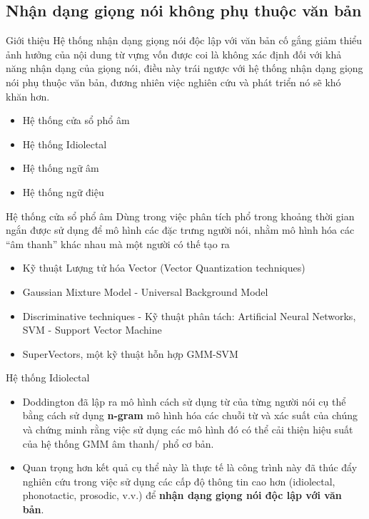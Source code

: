 \documentclass[notheorems, aspectratio=54]{beamer}
\begin{document}
\subsection{Nhận dạng giọng nói không phụ thuộc văn bản}
\begin{frame}{Giới thiệu}
	\qquad Hệ thống nhận dạng giọng nói độc lập với văn bản cố gắng giảm thiểu ảnh hưởng của nội dung từ vựng vốn được coi là không xác định đối với khả năng nhận dạng của giọng nói, điều này trái ngược với hệ thống nhận dạng giọng nói phụ thuộc văn bản, đương nhiên việc nghiên cứu và phát triển nó sẽ khó khăn hơn.
	\begin{itemize}
		\item Hệ thống cửa sổ phổ âm
		\item Hệ thống Idiolectal
		\item Hệ thống ngữ âm
		\item Hệ thống ngữ điệu
	\end{itemize}
\end{frame}
\begin{frame}{Hệ thống cửa sổ phổ âm}
	Dùng trong việc phân tích phổ trong khoảng thời gian ngắn được sử dụng để mô hình các đặc trưng người nói, nhằm mô hình hóa các “âm thanh” khác nhau mà một người có thế tạo ra
	\begin{itemize}
		\item Kỹ thuật Lượng tử hóa Vector (Vector Quantization techniques)
		\item Gaussian Mixture Model - Universal Background Model
		\item Discriminative techniques - Kỹ thuật phân tách: Artificial Neural Networks, SVM - Support Vector Machine
		\item SuperVectors, một kỹ thuật hỗn hợp GMM-SVM
	\end{itemize}
\end{frame}
\begin{frame}{Hệ thống Idiolectal}
	\begin{itemize}
		\item Doddington đã lập ra mô hình cách sử dụng từ của từng người nói cụ thể bằng cách sử dụng \textbf{n-gram} mô hình hóa các chuỗi từ và xác suất của chúng và chứng minh rằng việc sử dụng các mô hình đó có thể cải thiện hiệu suất của hệ thống GMM âm thanh/ phổ cơ bản. 
		\item Quan trọng hơn kết quả cụ thể này là thực tế là công trình này đã thúc đẩy nghiên cứu trong việc sử dụng các cấp độ thông tin cao hơn (idiolectal, phonotactic, prosodic, v.v.) để \textbf{nhận dạng giọng nói độc lập với văn bản}. 
	\end{itemize}
\end{frame}
\end{document}
